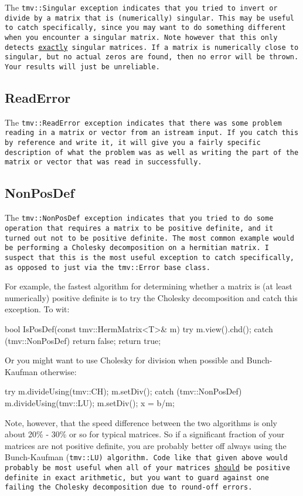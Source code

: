 The \tt{tmv::Singular} exception indicates that you tried to invert or divide by a matrix
that is (numerically) singular.  This may be useful to catch specifically,
since you may want to do something different when you encounter a singular
matrix.  Note however that this only detects \underline{exactly} singular
matrices.  If a matrix is numerically close to singular, but no actual 
zeros are found, then no error will be thrown.  Your results will just be 
unreliable.

\subsection{ReadError}
\label{ReadError}

The \tt{tmv::ReadError} exception indicates that there was some problem reading in a matrix or 
vector from an \tt{istream} input.  If you catch this by reference and write it,
it will give you a fairly specific description of what the problem was as well as
writing the part of the matrix or vector that was read in successfully.

\subsection{NonPosDef}
\label{NonPosDef}

The \tt{tmv::NonPosDef} exception indicates that you tried to do some operation that requires
a matrix to be positive definite, and it turned out not to be positive definite.
The most common example would be performing a Cholesky decomposition on a 
hermitian matrix.  I suspect that this is the 
most useful exception to catch specifically, as opposed to just via the \tt{tmv::Error} base class.

For example, the fastest algorithm for determining whether a matrix is 
(at least numerically) positive definite is to try the Cholesky decomposition
and catch this exception.  To wit:
\begin{tmvcode}
bool IsPosDef(const tmv::HermMatrix<T>& m)
{
    try {
        m.view().chd();
    } catch (tmv::NonPosDef) {
        return false;
    }
    return true;
}
\end{tmvcode}
Or you might want to use Cholesky for division when possible and Bunch-Kaufman otherwise:
\begin{tmvcode}
try {
    m.divideUsing(tmv::CH);
    m.setDiv();
} catch (tmv::NonPosDef) {
    m.divideUsing(tmv::LU);
    m.setDiv();
}
x = b/m;
\end{tmvcode}
Note, however, that the speed difference between the two algorithms is only about
20\% - 30\% or so for typical matrices.  So if a significant fraction of your matrices are 
not positive definite, you are probably better off always using the Bunch-Kaufman (\tt{tmv::LU}) algorithm.  
Code like that given above would probably be most useful when all of your 
matrices \underline{should} be positive definite in exact arithmetic, but you 
want to guard against one failing the Cholesky decomposition due to round-off
errors.

